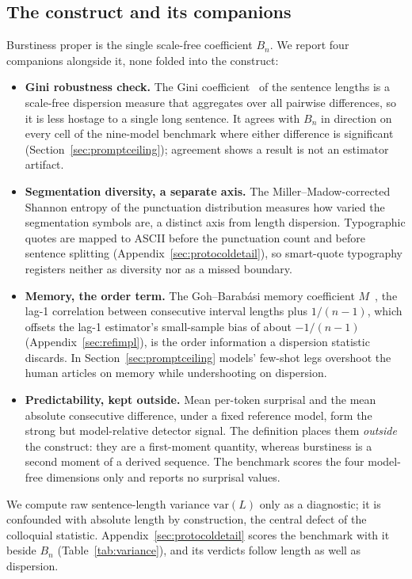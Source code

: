 \documentclass{article}
\begin{document}
\subsection{The construct and its companions}
Burstiness proper is the single scale-free coefficient $B_n$. We report four companions
alongside it, none folded into the construct:
\begin{itemize}
\item \textbf{Gini robustness check.} The Gini coefficient~\citep{gini1912variabilit} of the sentence
lengths is a scale-free dispersion measure that aggregates over all pairwise differences, so it is
less hostage to a single long sentence. It agrees with $B_n$ in direction on every cell of the
nine-model benchmark where either difference is significant (Section~\ref{sec:promptceiling});
agreement shows a result is not an estimator artifact.
\item \textbf{Segmentation diversity, a separate axis.} The Miller--Madow-corrected Shannon entropy of
the punctuation distribution measures how varied the segmentation symbols are, a distinct axis from
length dispersion. Typographic quotes are mapped to ASCII before the punctuation count and before
sentence splitting (Appendix~\ref{sec:protocoldetail}), so smart-quote typography registers neither
as diversity nor as a missed boundary.
\item \textbf{Memory, the order term.} The Goh--Barab\'asi memory coefficient
$M$~\citep{goh2008burstiness}, the lag-1 correlation between consecutive interval lengths plus
$1/(n-1)$, which offsets the lag-1 estimator's small-sample bias of about $-1/(n-1)$
(Appendix~\ref{sec:refimpl}), is the order information a dispersion statistic discards. In Section~\ref{sec:promptceiling}
 models' few-shot legs overshoot the human articles on memory while undershooting
on dispersion.
\item \textbf{Predictability, kept outside.} Mean per-token surprisal and the mean absolute
consecutive difference, under a fixed reference model, form the strong but model-relative detector
signal. The definition places them \emph{outside} the construct: they are a first-moment quantity, whereas burstiness is a second moment of a derived sequence. The benchmark scores the four model-free dimensions only and reports no surprisal values.
\end{itemize}
We compute raw sentence-length variance $\mathrm{var}(L)$ only as a diagnostic; it is confounded with
absolute length by construction, the central defect of the colloquial statistic.
Appendix~\ref{sec:protocoldetail} scores the benchmark with it beside $B_n$ (Table~\ref{tab:variance}),
and its verdicts follow length as well as dispersion.
\end{document}
